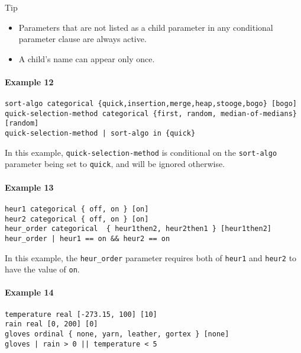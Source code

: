 \documentclass[manual.tex]{subfiles}
\begin{document}
\begin{bclogo}[logo=\bclampe, couleurBarre=red, noborder=true]{Tip}
\begin{itemize}
\item Parameters that are not listed as a child parameter in any conditional parameter clause are always active.
\item A child's name can appear only once.
\end{itemize}
\end{bclogo}



\paragraph{Example 12}

\begin{verbatim}
sort-algo categorical {quick,insertion,merge,heap,stooge,bogo} [bogo]
quick-selection-method categorical {first, random, median-of-medians} [random]
quick-selection-method | sort-algo in {quick}
\end{verbatim}
In this example, \texttt{quick-selection-method} is conditional on the \texttt{sort-algo} parameter being set to \texttt{quick}, and will be ignored otherwise.

\paragraph{Example 13}

\begin{verbatim}
heur1 categorical { off, on } [on]
heur2 categorical { off, on } [on]
heur_order categorical  { heur1then2, heur2then1 } [heur1then2]
heur_order | heur1 == on && heur2 == on
\end{verbatim}

In this example, the \texttt{heur\_order} parameter requires both of \texttt{heur1} and \texttt{heur2} to have the value of \texttt{on}.

\paragraph{Example 14}
\begin{verbatim}
temperature real [-273.15, 100] [10]
rain real [0, 200] [0]
gloves ordinal { none, yarn, leather, gortex } [none]
gloves | rain > 0 || temperature < 5
\end{verbatim}
\end{document}
